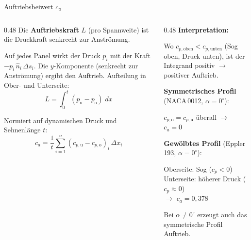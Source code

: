 \documentclass[aspectratio=169]{beamer}
\begin{document}
\begin{frame}{Auftriebsbeiwert $c_a$}
\footnotesize

\begin{columns}[T]
\begin{column}{0.48\textwidth}
Die \textbf{Auftriebskraft} $L$ (pro Spannweite) ist die
Druckkraft senkrecht zur Anströmung.

\medskip
Auf jedes Panel wirkt der Druck $p_i$ mit der Kraft
$-p_i\,\hat{n}_i\,\Delta s_i$. Die $y$-Komponente (senkrecht
zur Anströmung) ergibt den Auftrieb.
Aufteilung in Ober- und Unterseite:
\vspace{-1mm}
\[
  L = \int_0^t\!(p_{\text{u}} - p_{\text{o}})\;dx
\]

\vspace{-3mm}
Normiert auf dynamischen Druck und Sehnenlänge $t$:
\vspace{-1mm}
\[
  \boxed{c_a = \frac{1}{t}\sum_{i=1}^{n}
  (c_{p,\text{u}} - c_{p,\text{o}})_i\,\Delta x_i}
\]
\end{column}
\begin{column}{0.48\textwidth}
\textbf{Interpretation:}

\medskip
Wo $c_{p,\text{oben}} < c_{p,\text{unten}}$ (Sog oben,
Druck unten), ist der Integrand positiv
$\to$ positiver Auftrieb.

\medskip
\textbf{Symmetrisches Profil} (NACA\,0012, $\alpha\!=\!0^\circ$):

$c_{p,\text{o}} = c_{p,\text{u}}$ überall $\to$ $c_a = 0$

\medskip
\textbf{Gewölbtes Profil} (Eppler\,193, $\alpha\!=\!0^\circ$):

Oberseite: Sog ($c_p < 0$)\\
Unterseite: höherer Druck ($c_p \approx 0$)\\
$\to$ $c_a = 0{,}378$

\medskip
Bei $\alpha\!\neq\!0^\circ$ erzeugt auch das symmetrische
Profil Auftrieb.
\end{column}
\end{columns}

\end{frame}
\end{document}
